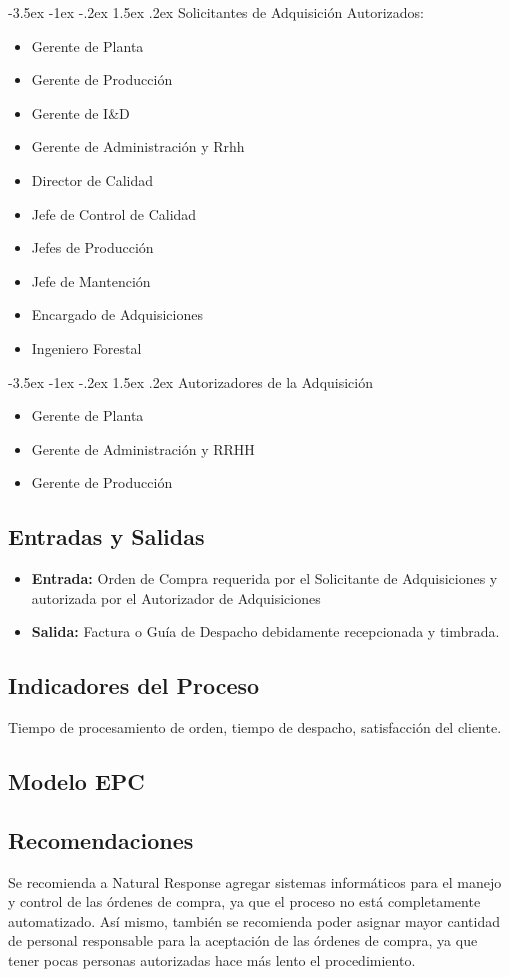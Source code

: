 \documentclass[12pt,letterpaper]{article}
\makeatletter
\newcommand\subsubsubsection{\@startsection {paragraph}{1}{\z@}%
                                   {-3.5ex \@plus -1ex \@minus -.2ex}%
                                   {1.5ex \@plus.2ex}%
                                   {\normalfont\bfseries}}
\makeatother
\begin{document}
\subsubsubsection{Solicitantes de Adquisición Autorizados:}
\begin{itemize}
\item Gerente de Planta
\item Gerente de Producción
\item Gerente de I\&D
\item Gerente de Administración y Rrhh
\item Director de Calidad
\item Jefe de Control de Calidad
\item Jefes de Producción
\item Jefe de Mantención
\item Encargado de Adquisiciones
\item Ingeniero Forestal
\end{itemize}

\subsubsubsection{Autorizadores de la Adquisición}
\begin{itemize}
\item Gerente de Planta
\item Gerente de Administración y RRHH
\item Gerente de Producción
\end{itemize}

\subsection{Entradas y Salidas}
\begin{itemize}
\item \textbf{Entrada:} Orden de Compra requerida por el Solicitante de Adquisiciones y autorizada por el Autorizador de Adquisiciones
\item \textbf{Salida:} Factura o Guía de Despacho debidamente recepcionada y timbrada.
\end{itemize}

\subsection{Indicadores del Proceso}
Tiempo de procesamiento de orden, tiempo de despacho, satisfacción del cliente.

\subsection{Modelo EPC}

\subsection{Recomendaciones}
Se recomienda a Natural Response agregar sistemas informáticos para el manejo y control de las órdenes de compra, ya que el proceso no está completamente automatizado. Así mismo, también se recomienda poder asignar mayor cantidad de personal responsable para la aceptación de las órdenes de compra, ya que tener pocas personas autorizadas hace más lento el procedimiento.
\end{document}
